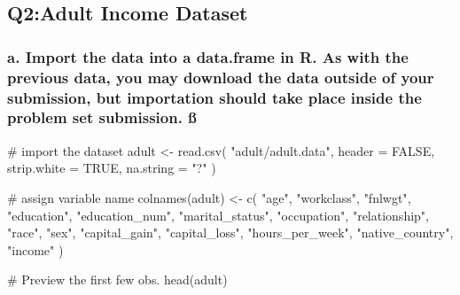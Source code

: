 \documentclass[
  letterpaper,
  DIV=11,
  numbers=noendperiod]{scrartcl}
\newenvironment{Shaded}{\begin{snugshade}}{\end{snugshade}}
\newcommand{\AttributeTok}[1]{\textcolor[rgb]{0.40,0.45,0.13}{#1}}
\newcommand{\CommentTok}[1]{\textcolor[rgb]{0.37,0.37,0.37}{#1}}
\newcommand{\ConstantTok}[1]{\textcolor[rgb]{0.56,0.35,0.01}{#1}}
\newcommand{\FunctionTok}[1]{\textcolor[rgb]{0.28,0.35,0.67}{#1}}
\newcommand{\NormalTok}[1]{\textcolor[rgb]{0.00,0.23,0.31}{#1}}
\newcommand{\OtherTok}[1]{\textcolor[rgb]{0.00,0.23,0.31}{#1}}
\newcommand{\StringTok}[1]{\textcolor[rgb]{0.13,0.47,0.30}{#1}}
\begin{document}
\subsection{Q2:Adult Income Dataset}\label{q2adult-income-dataset}

\subsubsection{a. Import the data into a data.frame in R. As with the
previous data, you may download the data outside of your submission, but
importation should take place inside the problem set submission.
ß}\label{a.-import-the-data-into-a-data.frame-in-r.-as-with-the-previous-data-you-may-download-the-data-outside-of-your-submission-but-importation-should-take-place-inside-the-problem-set-submission.-uxdf}

\begin{Shaded}
\begin{Highlighting}[]
\CommentTok{\# import the dataset}
\NormalTok{adult }\OtherTok{\textless{}{-}} \FunctionTok{read.csv}\NormalTok{(}
  \StringTok{"adult/adult.data"}\NormalTok{,}
  \AttributeTok{header =} \ConstantTok{FALSE}\NormalTok{,}
  \AttributeTok{strip.white =} \ConstantTok{TRUE}\NormalTok{,}
  \AttributeTok{na.string =} \StringTok{"?"}
\NormalTok{)}

\CommentTok{\# assign variable name}
\FunctionTok{colnames}\NormalTok{(adult) }\OtherTok{\textless{}{-}} \FunctionTok{c}\NormalTok{(}
  \StringTok{"age"}\NormalTok{,}
  \StringTok{"workclass"}\NormalTok{,}
  \StringTok{"fnlwgt"}\NormalTok{,}
  \StringTok{"education"}\NormalTok{,}
  \StringTok{"education\_num"}\NormalTok{,}
  \StringTok{"marital\_status"}\NormalTok{,}
  \StringTok{"occupation"}\NormalTok{,}
  \StringTok{"relationship"}\NormalTok{,}
  \StringTok{"race"}\NormalTok{,}
  \StringTok{"sex"}\NormalTok{,}
  \StringTok{"capital\_gain"}\NormalTok{,}
  \StringTok{"capital\_loss"}\NormalTok{,}
  \StringTok{"hours\_per\_week"}\NormalTok{,}
  \StringTok{"native\_country"}\NormalTok{,}
  \StringTok{"income"}
\NormalTok{)}

\CommentTok{\# Preview the first few obs.}
\FunctionTok{head}\NormalTok{(adult)}
\end{Highlighting}
\end{Shaded}
\end{document}
